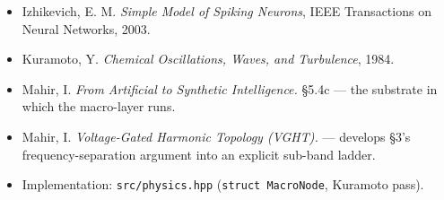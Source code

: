 \documentclass[
  11pt,
  a4paper,
]{article}
\providecommand{\tightlist}{%
  \setlength{\itemsep}{0pt}\setlength{\parskip}{0pt}}
\begin{document}
\begin{itemize}
\tightlist
\item
  Izhikevich, E. M. \emph{Simple Model of Spiking Neurons}, IEEE
  Transactions on Neural Networks, 2003.
\item
  Kuramoto, Y. \emph{Chemical Oscillations, Waves, and Turbulence},
  1984.
\item
  Mahir, I. \emph{From Artificial to Synthetic Intelligence.} §5.4c ---
  the substrate in which the macro-layer runs.
\item
  Mahir, I. \emph{Voltage-Gated Harmonic Topology (VGHT).} --- develops
  §3's frequency-separation argument into an explicit sub-band ladder.
\item
  Implementation: \texttt{src/physics.hpp} (\texttt{struct\ MacroNode},
  Kuramoto pass).
\end{itemize}
\end{document}

